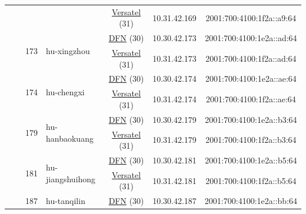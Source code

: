 \begin{small}
\begin{center}
\begin{longtable}{|c|c|c|c|c|c|c|c|}
  &  &  &  & \multicolumn{2}{|c|}{\tiny{\href{http://www.versatel.de}{Versatel} (31)}} & \tiny{10.31.42.169} & \tiny{2001:700:4100:1f2a::a9:64} \\* \cline{3-3}\cline{4-4}\cline{5-5}\cline{6-6}\cline{7-7}\cline{8-8}
  &  & \multirow{2}{*}{\tiny{173}} & \multicolumn{1}{|l|}{\multirow{2}{*}{\tiny{hu-xingzhou}}} & \multicolumn{2}{|c|}{\tiny{\href{https://www.dfn.de}{DFN} (30)}} & \tiny{10.30.42.173} & \tiny{2001:700:4100:1e2a::ad:64} \\* \cline{5-5}\cline{6-6}\cline{7-7}\cline{8-8}
  &  &  &  & \multicolumn{2}{|c|}{\tiny{\href{http://www.versatel.de}{Versatel} (31)}} & \tiny{10.31.42.173} & \tiny{2001:700:4100:1f2a::ad:64} \\* \cline{3-3}\cline{4-4}\cline{5-5}\cline{6-6}\cline{7-7}\cline{8-8}
  &  & \multirow{2}{*}{\tiny{174}} & \multicolumn{1}{|l|}{\multirow{2}{*}{\tiny{hu-chengxi}}} & \multicolumn{2}{|c|}{\tiny{\href{https://www.dfn.de}{DFN} (30)}} & \tiny{10.30.42.174} & \tiny{2001:700:4100:1e2a::ae:64} \\* \cline{5-5}\cline{6-6}\cline{7-7}\cline{8-8}
  &  &  &  & \multicolumn{2}{|c|}{\tiny{\href{http://www.versatel.de}{Versatel} (31)}} & \tiny{10.31.42.174} & \tiny{2001:700:4100:1f2a::ae:64} \\* \cline{3-3}\cline{4-4}\cline{5-5}\cline{6-6}\cline{7-7}\cline{8-8}
  &  & \multirow{2}{*}{\tiny{179}} & \multicolumn{1}{|l|}{\multirow{2}{*}{\tiny{hu-hanbaokuang}}} & \multicolumn{2}{|c|}{\tiny{\href{https://www.dfn.de}{DFN} (30)}} & \tiny{10.30.42.179} & \tiny{2001:700:4100:1e2a::b3:64} \\* \cline{5-5}\cline{6-6}\cline{7-7}\cline{8-8}
  &  &  &  & \multicolumn{2}{|c|}{\tiny{\href{http://www.versatel.de}{Versatel} (31)}} & \tiny{10.31.42.179} & \tiny{2001:700:4100:1f2a::b3:64} \\* \cline{3-3}\cline{4-4}\cline{5-5}\cline{6-6}\cline{7-7}\cline{8-8}
  &  & \multirow{2}{*}{\tiny{181}} & \multicolumn{1}{|l|}{\multirow{2}{*}{\tiny{hu-jiangshuihong}}} & \multicolumn{2}{|c|}{\tiny{\href{https://www.dfn.de}{DFN} (30)}} & \tiny{10.30.42.181} & \tiny{2001:700:4100:1e2a::b5:64} \\* \cline{5-5}\cline{6-6}\cline{7-7}\cline{8-8}
  &  &  &  & \multicolumn{2}{|c|}{\tiny{\href{http://www.versatel.de}{Versatel} (31)}} & \tiny{10.31.42.181} & \tiny{2001:700:4100:1f2a::b5:64} \\* \cline{3-3}\cline{4-4}\cline{5-5}\cline{6-6}\cline{7-7}\cline{8-8}
  &  & \multirow{2}{*}{\tiny{187}} & \multicolumn{1}{|l|}{\multirow{2}{*}{\tiny{hu-tanqilin}}} & \multicolumn{2}{|c|}{\tiny{\href{https://www.dfn.de}{DFN} (30)}} & \tiny{10.30.42.187} & \tiny{2001:700:4100:1e2a::bb:64} \\* \cline{5-5}\cline{6-6}\cline{7-7}\cline{8-8}

\end{longtable}
\end{center}
\end{small}
